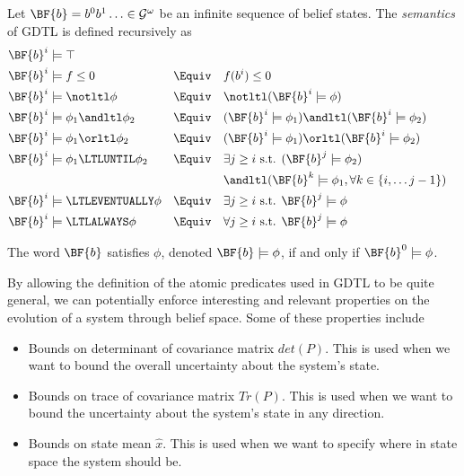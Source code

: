 \begin{definition}  
\label{def:gdtl-semantics}
Let $\BF{b} = b^0b^1 \ldots \in \mathcal{G}^{\omega}$
be an infinite sequence of belief states.
The {\em semantics} of GDTL is defined recursively as
\begin{align*}
&\BF{b}^i \models  \top  & \\
&\BF{b}^i \models f \leq 0 & \Equiv\quad & f(b^i) \leq 0\\ %
&\BF{b}^i \models \notltl \phi & \Equiv\quad & \notltl (\BF{b}^i \models \phi) \\
&\BF{b}^i \models \phi_1 \andltl  \phi_2  & \Equiv\quad & ( \BF{b}^i \models \phi_1 ) \andltl ( \BF{b}^i \models \phi_2 ) \\
&\BF{b}^i \models \phi_1 \orltl  \phi_2  & \Equiv\quad & ( \BF{b}^i \models \phi_1 ) \orltl ( \BF{b}^i \models \phi_2 ) \\
&\BF{b}^i \models  \phi_1 \LTLUNTIL \phi_2 & \Equiv\quad & \exists j \geq i \text{ s.t. } ( \BF{b}^j \models \phi_2 ) \\
& & & \andltl (\BF{b}^k \models \phi_1, \forall k \in \{i, \ldots j-1\})\\
&\BF{b}^i \models \LTLEVENTUALLY \phi  & \Equiv\quad & \exists j \geq i \text{ s.t. } \BF{b}^j \models \phi \\
&\BF{b}^i \models \LTLALWAYS \phi  & \Equiv\quad & \forall j \geq i \text{ s.t. } \BF{b}^j \models \phi
\end{align*}

The word $\BF{b}$ satisfies $\phi$, denoted $\BF{b} \models \phi$,
if and only if $\BF{b}^0 \models \phi$.
\end{definition}

By allowing the definition of the atomic predicates used in GDTL to be quite general,
we can potentially enforce interesting and relevant properties on the evolution of a system
through belief space.  Some of these properties include

\begin{itemize}
 \item Bounds on determinant of covariance matrix $det(P)$.  This is used when 
 we want to bound the overall uncertainty about the system's state.
 \item Bounds on trace of covariance matrix $Tr(P)$.  This is used when we
 want to bound the uncertainty about the system's state in any direction.
 \item Bounds on state mean $\hat{x}$.  This is used when we want to specify
 where in state space the system should be.
\end{itemize}

